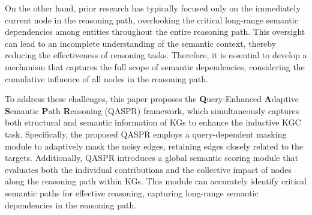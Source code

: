 \documentclass[sigconf]{acmart}
\begin{document}
On the other hand, prior research has typically focused only on the immediately current node in the reasoning path, overlooking the critical long-range semantic dependencies among entities throughout the entire reasoning path. %
This oversight can lead to an incomplete understanding of the semantic context, thereby reducing the effectiveness of reasoning tasks. Therefore, it is essential to develop a mechanism that captures the full scope of semantic dependencies, considering the cumulative influence of all nodes in the reasoning path.


To address these challenges, this paper proposes the \textbf{Q}uery-Enhanced \textbf{A}daptive \textbf{S}emantic \textbf{P}ath \textbf{R}easoning (QASPR) framework, which simultaneously captures both structural and semantic information of KGs to enhance the inductive KGC task. Specifically, the proposed QASPR employs a query-dependent masking module to adaptively mask the noisy edges, retaining edges closely related to the targets. Additionally, QASPR introduces a global semantic scoring module that evaluates both the individual contributions and the collective impact of nodes along the reasoning path within KGs. This module can accurately identify critical semantic paths for effective reasoning, capturing long-range semantic dependencies in the reasoning path.


\end{document}
